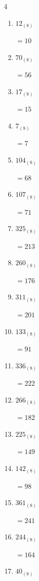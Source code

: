 \begin{multicols}{4}
\begin{enumerate}
  \item $12_{(8)}$

        $=10$

  \item $70_{(8)}$

        $=56$

  \item $17_{(8)}$

        $=15$

  \item $7_{(8)}$

        $=7$

  \item $104_{(8)}$

        $=68$

  \item $107_{(8)}$

        $=71$

  \item $325_{(8)}$

        $=213$

  \item $260_{(8)}$

        $=176$

  \item $311_{(8)}$

        $=201$

  \item $133_{(8)}$

        $=91$

  \item $336_{(8)}$

        $=222$

\columnbreak %

  \item $266_{(8)}$

        $=182$

  \item $225_{(8)}$

        $=149$

  \item $142_{(8)}$

        $=98$

  \item $361_{(8)}$

        $=241$

  \item $244_{(8)}$

        $=164$

  \item $40_{(8)}$


\end{enumerate}
\end{multicols}
